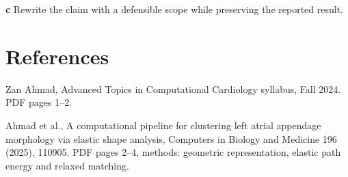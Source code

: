 \documentclass[11pt,letterpaper]{article}
\theoremstyle{definition}\newtheorem{definition}{Definition}\newtheorem{example}{Example}
\numberwithin{equation}{section}
\begin{document}
\textbf{c} Rewrite the claim with a defensible scope while preserving the reported result.

\section*{References}
\noindent\begin{minipage}{\linewidth}
Zan Ahmad, Advanced Topics in Computational Cardiology syllabus, Fall 2024. PDF pages 1--2.

\end{minipage}\par\medskip
\noindent\begin{minipage}{\linewidth}
Ahmad et al., A computational pipeline for clustering left atrial appendage morphology via elastic shape analysis, Computers in Biology and Medicine 196 (2025), 110905. PDF pages 2--4, methods: geometric representation, elastic path energy and relaxed matching.

\end{minipage}\par\medskip
\end{document}
